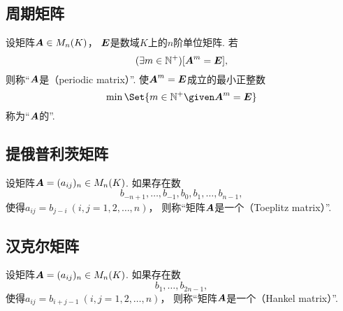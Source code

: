 \subsection{周期矩阵}
\begin{definition}
设矩阵\(\boldsymbol{A} \in M_n(K)\)，
\(\boldsymbol{E}\)是数域\(K\)上的\(n\)阶单位矩阵.
若\begin{equation*}
	(\exists m\in\mathbb{N}^+)
	[\boldsymbol{A}^m = \boldsymbol{E}],
\end{equation*}
则称“\(\boldsymbol{A}\)是（periodic matrix）”.
使\(\boldsymbol{A}^m = \boldsymbol{E}\)成立的最小正整数\begin{equation*}
	\min\Set{ m\in\mathbb{N}^+ \given \vb{A}^m = \vb{E} }
\end{equation*}称为“\(\boldsymbol{A}\)的”.
\end{definition}

\subsection{提俄普利茨矩阵}
\begin{definition}
设矩阵\(\boldsymbol{A}=(a_{ij})_n \in M_n(K)\).
如果存在数\begin{equation*}
	b_{-n+1},\dotsc,b_{-1},b_0,b_1,\dotsc,b_{n-1},
\end{equation*}
使得\(a_{ij} = b_{j-i}\ (i,j=1,2,\dotsc,n)\)，
则称“矩阵\(\boldsymbol{A}\)是一个（Toeplitz matrix）”.
\end{definition}

\subsection{汉克尔矩阵}
\begin{definition}
设矩阵\(\boldsymbol{A}=(a_{ij})_n \in M_n(K)\).
如果存在数\begin{equation*}
	b_1,\dotsc,b_{2n-1},
\end{equation*}
使得\(a_{ij} = b_{i+j-1}\ (i,j=1,2,\dotsc,n)\)，
则称“矩阵\(\boldsymbol{A}\)是一个（Hankel matrix）”.
\end{definition}

